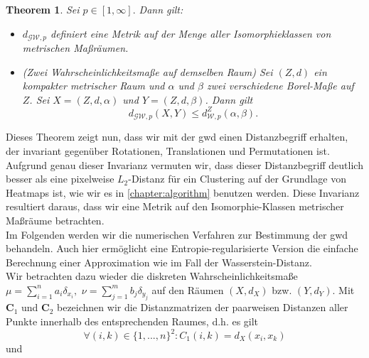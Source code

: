 \documentclass[twoside, 12pt,a4paper]{book}
\newtheorem{theorem}{Theorem}[subsection]
\numberwithin{equation}{section}
\begin{document}
	\begin{theorem}\cite[Thm. 5.1]{memoli2011gromov} Sei $p \in [1, \infty].$ Dann gilt:
		\begin{itemize}
			\item[(a)] $d_{\mathcal{GW},p}$ definiert eine Metrik auf der Menge aller Isomorphieklassen von metrischen Maßräumen. 
			\item[(b)] (Zwei Wahrscheinlichkeitsmaße auf demselben Raum) Sei $(Z,d)$ ein kompakter metrischer Raum und $\alpha$ und $\beta$ zwei verschiedene Borel-Maße auf $Z$. Sei $X=(Z,d,\alpha)$ und $Y=(Z,d,\beta)$. Dann gilt
			\begin{equation}
			d_{\mathcal{GW},p}(X,Y) \leq d_{\mathcal{W},p}^Z(\alpha,\beta).
			\end{equation}
		\end{itemize}
		
	\end{theorem}
	
	\noindent Dieses Theorem zeigt nun, dass wir mit der \ac{gwd} einen Distanzbegriff erhalten, der invariant gegenüber Rotationen, Translationen und Permutationen ist\cite{vayer2020contribution}. \\
	
	\noindent Aufgrund genau dieser Invarianz vermuten wir, dass dieser Distanzbegriff deutlich besser als eine pixelweise $L_2$-Distanz für ein Clustering auf der Grundlage von Heatmaps ist, wie wir es in \autoref{chapter:algorithm} benutzen werden. Diese Invarianz resultiert daraus, dass wir eine Metrik auf den Isomorphie-Klassen metrischer Maßräume betrachten.\\
	
	\noindent Im Folgenden werden wir die numerischen Verfahren zur Bestimmung der \ac{gwd} behandeln. Auch hier ermöglicht eine Entropie-regularisierte Version die einfache Berechnung einer Approximation wie im Fall der Wasserstein-Distanz.\\
	
	\noindent Wir betrachten dazu wieder die diskreten Wahrscheinlichkeitsmaße \\$\mu = \sum_{i=1}^n{a_i\delta_{x_i}},$ $\nu = \sum_{j=1}^m{b_j\delta_{y_j}}$ auf den Räumen $(X,d_X)$ bzw. $(Y,d_Y)$. Mit $\boldsymbol{C}_1$ und $\boldsymbol{C}_2$ bezeichnen wir die Distanzmatrizen der paarweisen Distanzen aller Punkte innerhalb des entsprechenden Raumes, d.h. es gilt \begin{equation}
		\forall (i,k) \in \lbrace 1,...,n \rbrace^2 : C_1(i,k) = d_X(x_i,x_k)
	\end{equation} und	
	
\end{document}
